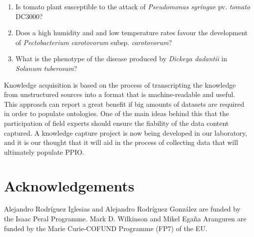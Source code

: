 \documentclass[sw]{iosart2c}
\begin{document}
\begin{enumerate}
\item Is tomato plant susceptible to the attack of {\itshape Pseudomonas syringae} pv. {\itshape tomato} DC3000?
\item Does a high humidity and and low temperature rates favour the development of {\itshape Pectobacterium carotovorum} subsp. {\itshape carotovorum}?
\item What is the phenotype of the disease produced by {\itshape Dickeya dadantii} in {\itshape Solanum tuberosum}?

\end{enumerate}

Knowledge acquisition is based on the process of transcripting the knowledge from unstructured sources into a format that is machine-readable and useful. This approach can report a great benefit if big amounts of datasets are required in order to populate ontologies. One of the main ideas behind this that the participation of field experts should ensure the fiability of the data content captured. A knowledge capture project is now being developed in our laboratory, and it is our thought that it will aid in the process of collecting data that will ultimately populate PPIO. 

\section*{Acknowledgements}
Alejandro Rodr\'iguez Iglesias and Alejandro Rodr\'iguez Gonz\'alez are funded by the Isaac Peral Programme. Mark D. Wilkinson and Mikel Ega\~na Aranguren are funded by the Marie Curie-COFUND Programme (FP7) of the EU.











  
\end{document}

